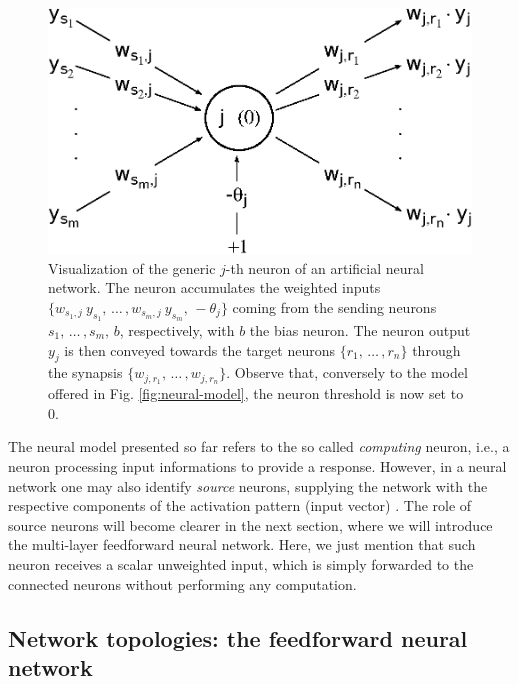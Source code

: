 \documentclass[12pt, a4paper, twoside, openright, notitlepage]{report}
\numberwithin{equation}{chapter}
\theoremstyle{theorem}
\theoremstyle{definition}
\theoremstyle{remark}
\theoremstyle{proposition}
\numberwithin{figure}{chapter}
\begin{document}
		\begin{figure}[t]
			\center
			\includegraphics[scale = 0.6]{neural_model_bias.eps}
			
			\caption{Visualization of the generic $j$-th neuron of an artificial neural network. The neuron accumulates the weighted inputs $\big\lbrace w_{s_1,j} ~ y_{s_1}, \, \ldots \, , w_{s_m,j} ~ y_{s_m}, \, -\theta_j \big\rbrace$ coming from the sending neurons $s_1, \, \ldots \, , s_m, \, b$, respectively, with $b$ the bias neuron. The neuron output $y_j$ is then conveyed towards the target neurons $\big\lbrace r_1, \, \ldots \, , r_n \big\rbrace$ through the synapsis $\big\lbrace w_{j,r_1}, \, \ldots \, , w_{j,r_n} \big\rbrace$. Observe that, conversely to the model offered in Fig. \ref{fig:neural-model}, the neuron threshold is now set to $0$.} 
			\label{fig:neural-model-bias}
		\end{figure}
		
		\vspace*{0.3cm}
		
		The neural model presented so far refers to the so called \emph{computing} neuron, i.e., a neuron processing input informations to provide a response. However, in a neural network one may also identify \emph{source} neurons, supplying the network with the respective components of the activation pattern (input vector) \cite{Hay05}. The role of source neurons will become clearer in the next section, where we will introduce the multi-layer feedforward neural network. Here, we just mention that such neuron receives a scalar unweighted input, which is simply forwarded to the connected neurons without performing any computation.
		
	\vspace*{0.3cm}
		
	\subsection{Network topologies: the feedforward neural network}
	\label{section:Network topologies}
			
\end{document}
